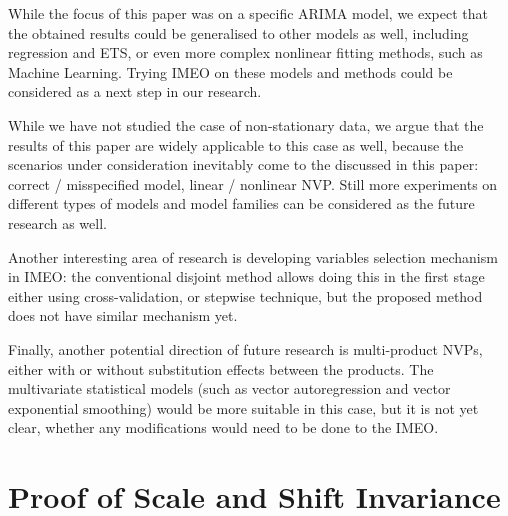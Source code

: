 \documentclass[a4paper,11pt]{article}
\begin{document}
While the focus of this paper was on a specific ARIMA model, we expect that the obtained results could be generalised to other models as well, including regression and ETS, or even more complex nonlinear fitting methods, such as Machine Learning. Trying IMEO on these models and methods could be considered as a next step in our research.

While we have not studied the case of non-stationary data, we argue that the results of this paper are widely applicable to this case as well, because the scenarios under consideration inevitably come to the discussed in this paper: correct / misspecified model, linear / nonlinear NVP. Still more experiments on different types of models and model families can be considered as the future research as well.

Another interesting area of research is developing variables selection mechanism in IMEO: the conventional disjoint method allows doing this in the first stage either using cross-validation, or stepwise technique, but the proposed method does not have similar mechanism yet.

Finally, another potential direction of future research is multi-product NVPs, either with or without substitution effects between the products. The multivariate statistical models (such as vector autoregression and vector exponential smoothing) would be more suitable in this case, but it is not yet clear, whether any modifications would need to be done to the IMEO.


\appendix

\section{Proof of Scale and Shift Invariance}
\label{app:A}
\end{document}
